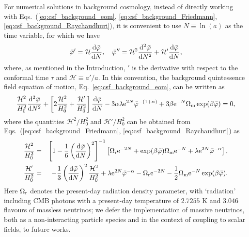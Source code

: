 For numerical solutions in background cosmology, instead of directly working with Eqs.~(\ref{eq:csf_background_eom}, \ref{eq:csf_background_Friedmann}, \ref{eq:csf_background_Raychaudhuri}), it is convenient to use $N\equiv\ln(a)$ as the time variable, for which we have
\begin{equation}
    \bar{\varphi}' = \mathcal{H}\frac{{\rm d}\bar{\varphi}}{{\rm d}N}, \quad \bar{\varphi}'' = \mathcal{H}^2\frac{{\rm d}^2\bar{\varphi}}{{\rm d}N^2} + \mathcal{H}'\frac{{\rm d}\bar{\varphi}}{{\rm d}N},
\end{equation}
where, as mentioned in the Introduction, $'$ is the derivative with respect to the conformal time $\tau$ and $\mathcal{H}\equiv a'/a$. In this convention, the background quintessence field equation of motion, Eq.~\eqref{eq:csf_background_eom}, can be written as
\begin{equation}\label{eq:csf_background_eom_codeunit}
    \frac{\mathcal{H}^2}{H_0^2}\frac{{\rm d}^2\bar{\varphi}}{{\rm d}N^2} + \left[2\frac{\mathcal{H}^2}{H^2_0}+\frac{\mathcal{H}'}{H_0^2}\right]\frac{{\rm d}\bar{\varphi}}{{\rm d}N} - 3\alpha\lambda{\rm e}^{2N}{\bar{\varphi}^{-(1+\alpha)}} + 3\beta{\rm e}^{-N}\Omega_{\rm m}\exp(\beta\bar{\varphi}) = 0,
\end{equation}
where the quantities $\mathcal{H}^2/H_0^2$ and $\mathcal{H}'/H_0^2$ can be obtained from Eqs.~(\ref{eq:csf_background_Friedmann}, \ref{eq:csf_background_Raychaudhuri}) as
\begin{eqnarray}
    \frac{\mathcal{H}^2}{H^2_0} &=& \left[1-\frac{1}{6}\left(\frac{{\rm d}\bar{\varphi}}{{\rm d}N}\right)^2\right]^{-1}\left[\Omega_{\rm r}{\rm e}^{-2N}+\exp(\beta\bar{\varphi})\Omega_{\rm m}{\rm e}^{-N}+\lambda{\rm e}^{2N}\bar{\varphi}^{-\alpha}\right],\\
    \frac{\mathcal{H}'}{H^2_0} &=& -\frac{1}{3}\left(\frac{{\rm d}\bar{\varphi}}{{\rm d}N}\right)^2\frac{\mathcal{H}^2}{H_0^2} + \lambda{\rm e}^{2N}\bar{\varphi}^{-\alpha} - \Omega_{\rm r}{\rm e}^{-2N} - \frac{1}{2}\Omega_{\rm m}{\rm e}^{-N}\exp(\beta\bar{\varphi}).
\end{eqnarray}
Here $\Omega_{\rm r}$ denotes the present-day radiation density parameter, with `radiation' including CMB photons with a present-day temperature of $2.7255$ K and $3.046$ flavours of massless neutrinos; we defer the implementation of massive neutrinos, both as a non-interacting particle species and in the context of coupling to scalar fields, to future works.

